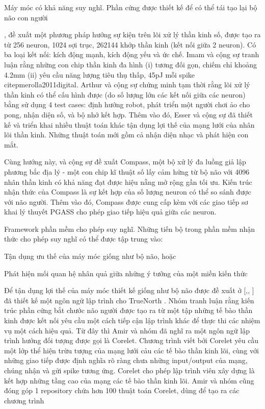 \documentclass{article}
\begin{document}
Máy móc có khả năng suy nghĩ. Phần cứng được thiết kế để có thể tái tạo lại bộ não con người

\citet{imam2012digital}, \citet{arthur2012building} đề xuất một phương pháp hướng sự kiện trên lõi xử lý thần kinh số, được tạo ra từ 256 neuron, 1024 sợi trục, 262144 khớp thần kinh (kết nối giữa 2 neuron). Có ba loại kết nối: kích động mạnh, kích động yếu và ức chế. Imam và cộng sự tranh luận rằng những con chip thần kinh đa hình (i) tương đối gọn, chiếm chỉ khoảng 4.2mm (ii) yêu cầu năng lượng tiêu thụ thấp, 45pJ mỗi spike citep{merolla2011digital}. Arthur và cộng sự chứng minh tạm thời rằng lõi xử lý thần kinh có thể cấu hình được (do số lượng lớn các kết nối giữa các neuron) bằng sử dụng 4 test cases: định hướng robot, phát triển một người chơi ảo cho pong, nhận diện số, và bộ nhớ kết hợp. Thêm vào đó, Esser và cộng sự \citep{esser2013cognitive} đã thiết kế và triển khai nhiều thuật toán khác tận dụng lợi thế của mạng lưới của nhân lõi thần kinh. Những thuật toán mới gồm cả nhận diện nhạc và phát hiện con mắt.

Cùng hướng này,  và cộng sự đề xuất Compass, một bộ xử lý đa luồng giả lập phương bắc địa lý - một con chip kĩ thuật số lấy cảm hứng từ bộ não với 4096 nhân thần kinh có khả năng đạt được hiệu nẵng mở rộng gần tối ưu. Kiến trúc nhận thức của Compass là sự kết hợp của số lượng neuron có thể so sánh được với não người. Thêm vào đó, Compass được cung cấp kèm với các giao tiếp sơ khai lý thuyết PGASS cho phép giao tiếp hiệu quả giữa các neuron.

Framework phần mềm cho phép suy nghĩ. Những tiến bộ trong phần mềm nhận thức cho phép suy nghĩ có thể được tập trung vào:

Tận dụng ưu thế của máy móc giống như bộ não, hoặc

Phát hiện mối quan hệ nhân quả giữa những ý tưởng của một miền kiến thức

Để tận dụng lợi thế của máy móc thiết kế giống như bộ não được đề xuất ở [\citet{arthur2012building},\citet{imam2012digital}, \citet{merolla2011digital}] \citet{amir2013cognitive} đã thiết kế một ngôn ngữ lập trình cho TrueNorth \citep{merolla2014million}. Nhóm tranh luận rằng kiến trúc phần cứng bắt chước não người được tạo ra từ một tập những tế bào thần kinh được kết nối yêu cầu một cách tiếp cận lập trình khác để thực thi các nhiệm vụ một cách hiệu quả. Từ đây thì Amir và nhóm đã nghĩ ra một ngôn ngữ lập trình hướng đối tượng được gọi là Corelet. Chương trình viết bởi Corelet yêu cầu một lớp thể hiện trừu tượng của mạng lưới cảu các tế bào thần kinh lõi, cùng với những giao tiếp được định nghĩa rõ ràng chưa những input/output của mạng, chúng nhận và gửi spike tương ứng. Corelet cho phép lập trình viên xây dựng là kết hợp những tầng cao của mạng các tế bào thần kinh lõi. Amir và nhóm cũng đóng góp 1 repository chứa hơn 100 thuật toán Corelet, dùng để tạo ra các chương trình
\end{document}
